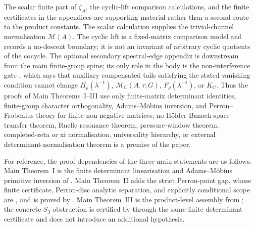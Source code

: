 The scalar finite part of \(\zeta_A\), the cyclic-lift comparison
calculations, and the finite certificates in the appendices are supporting
material rather than a second route to the product constants.  The scalar
calculation supplies the trivial-channel normalisation \(\mathcal M(A)\).
The cyclic lift is a fixed-matrix comparison model and records a no-descent
boundary; it is not an invariant of arbitrary cyclic quotients of the
cocycle.  The optional secondary spectral-edge appendix is downstream from the
main finite-group spine; its only role in the body is the non-interference gate
, which says that auxiliary
compensated tails satisfying the stated vanishing condition cannot change
\(\Pi_\varrho(\lambda^{-1})\), \(\mathcal M_C(A,\tau;G)\),
\(F_\varrho(\lambda^{-1})\), or \(K_C\). Thus the
proofs of Main Theorems~I--III use only finite-matrix determinant identities,
finite-group character orthogonality, Adams--M\"obius inversion, and
Perron--Frobenius theory for finite non-negative matrices; no H\"older
Banach-space transfer theorem, Ruelle resonance theorem, pressure-window
theorem, completed-zeta or xi normalisation, universality hierarchy, or
external determinant-normalisation theorem is a premise of the paper.

For reference, the proof dependencies of the three main statements are as
follows.  Main Theorem~I is the finite determinant linearisation and
Adams--M\"obius primitive inversion of
.  Main
Theorem~II adds the strict Perron-point gap, whose finite certificate,
Perron-disc analytic separation, and explicitly conditional scope are
,
and is proved by
.  Main Theorem~III is the product-level assembly
from ; the concrete \(S_3\) obstruction is
certified by  through the same finite determinant certificate and
does not introduce an additional hypothesis.

